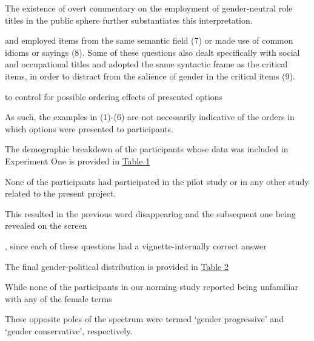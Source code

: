 The existence of overt commentary on the employment of gender-neutral role titles in the public sphere further substantiates this interpretation. 

and employed items from the same semantic field (7) or made use of common idioms or sayings (8). Some of these questions also dealt specifically with social and occupational titles and adopted the same syntactic frame as the critical items, in order to distract from the salience of gender in the critical items (9). 

 to control for possible ordering effects of presented options
 
 As such, the examples in (1)-(6) are not necessarily indicative of the orders in which options were presented to participants.
 
 The demographic breakdown of the participants whose data was included in Experiment One is provided in \hyperref[exp1-sample-table]{Table 1}
 
 None of the participants had participated in the pilot study or in any other study related to the present project.
 
 This resulted in the previous word disappearing and the subsequent one being revealed on the screen
 
 , since each of these questions had a vignette-internally correct answer
 
 The final gender-political distribution is provided in \hyperref[exp2-sample-table]{Table 2}
 
 While none of the participants in our norming study reported being unfamiliar with any of the female terms
 
 These opposite poles of the spectrum were termed `gender progressive' and `gender conservative', respectively.
 
 